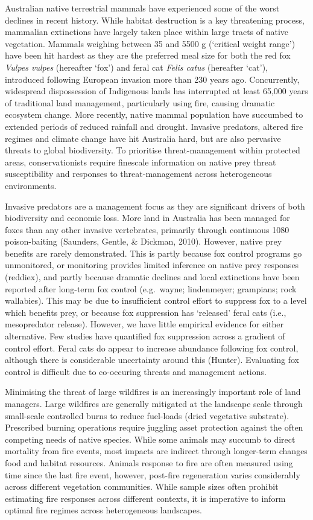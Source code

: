 \documentclass[11pt,a4paper,titlepage,twoside,openright]{style/unimelbthesis}
\begin{document}
\begin{mainmatter}
Australian native terrestrial mammals have experienced some of the worst declines in recent history. While habitat destruction is a key threatening process, mammalian extinctions have largely taken place within large tracts of native vegetation. Mammals weighing between 35 and 5500 g (`critical weight range') have been hit hardest as they are the preferred meal size for both the red fox \emph{Vulpes vulpes} (hereafter `fox') and feral cat \emph{Felis catus} (hereafter `cat'), introduced following European invasion more than 230 years ago. Concurrently, widespread dispossession of Indigenous lands has interrupted at least 65,000 years of traditional land management, particularly using fire, causing dramatic ecosystem change. More recently, native mammal population have succumbed to extended periods of reduced rainfall and drought. Invasive predators, altered fire regimes and climate change have hit Australia hard, but are also pervasive threats to global biodiversity. To prioritise threat-management within protected areas, conservationists require finescale information on native prey threat susceptibility and responses to threat-management across heterogeneous environments.

Invasive predators are a management focus as they are significant drivers of both biodiversity and economic loss. More land in Australia has been managed for foxes than any other invasive vertebrates, primarily through continuous 1080 poison-baiting (Saunders, Gentle, \& Dickman, 2010). However, native prey benefits are rarely demonstrated. This is partly because fox control programs go unmonitored, or monitoring provides limited inference on native prey responses (reddiex), and partly because dramatic declines and local extinctions have been reported after long-term fox control (e.g.~wayne; lindenmeyer; grampians; rock wallabies). This may be due to insufficient control effort to suppress fox to a level which benefits prey, or because fox suppression has `released' feral cats (i.e., mesopredator release). However, we have little empirical evidence for either alternative. Few studies have quantified fox suppression across a gradient of control effort. Feral cats do appear to increase abundance following fox control, although there is considerable uncertainty around this (Hunter). Evaluating fox control is difficult due to co-occuring threats and management actions.

Minimising the threat of large wildfires is an increasingly important role of land managers. Large wildfires are generally mitigated at the landscape scale through small-scale controlled burns to reduce fuel-loads (dried vegetative substrate). Prescribed burning operations require juggling asset protection against the often competing needs of native species. While some animals may succumb to direct mortality from fire events, most impacts are indirect through longer-term changes food and habitat resources. Animals response to fire are often measured using time since the last fire event, however, post-fire regeneration varies considerably across different vegetation communities. While sample sizes often prohibit estimating fire responses across different contexts, it is imperative to inform optimal fire regimes across heterogeneous landscapes.


\end{mainmatter}
\end{document}
